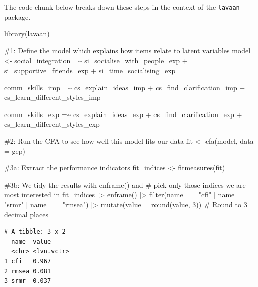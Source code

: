 \documentclass[
  letterpaper,
]{krantz}
\makeatletter
\newenvironment{Shaded}{\begin{snugshade}}{\end{snugshade}}
\newcommand{\AttributeTok}[1]{\textcolor[rgb]{0.40,0.45,0.13}{#1}}
\newcommand{\CommentTok}[1]{\textcolor[rgb]{0.37,0.37,0.37}{#1}}
\newcommand{\DecValTok}[1]{\textcolor[rgb]{0.68,0.00,0.00}{#1}}
\newcommand{\FunctionTok}[1]{\textcolor[rgb]{0.28,0.35,0.67}{#1}}
\newcommand{\NormalTok}[1]{\textcolor[rgb]{0.00,0.23,0.31}{#1}}
\newcommand{\OtherTok}[1]{\textcolor[rgb]{0.00,0.23,0.31}{#1}}
\newcommand{\SpecialCharTok}[1]{\textcolor[rgb]{0.37,0.37,0.37}{#1}}
\newcommand{\StringTok}[1]{\textcolor[rgb]{0.13,0.47,0.30}{#1}}
\newenvironment{kframe}{%
\medskip{}
\setlength{\fboxsep}{.8em}
 \def\at@end@of@kframe{}%
 \ifinner\ifhmode%
  \def\at@end@of@kframe{\end{minipage}}%
  \begin{minipage}{\columnwidth}%
 \fi\fi%
 \def\FrameCommand##1{\hskip\@totalleftmargin \hskip-\fboxsep
 \colorbox{shadecolor}{##1}\hskip-\fboxsep
     \hskip-\linewidth \hskip-\@totalleftmargin \hskip\columnwidth}%
 \MakeFramed {\advance\hsize-\width
   \@totalleftmargin\z@ \linewidth\hsize
   \@setminipage}}%
 {\par\unskip\endMakeFramed%
 \at@end@of@kframe}
\renewenvironment{Shaded}{\begin{kframe}}{\end{kframe}}
\makeatother
\begin{document}
The code chunk below breaks down these steps in the context of the
\texttt{lavaan} package.

\begin{Shaded}
\begin{Highlighting}[]
\FunctionTok{library}\NormalTok{(lavaan)}

\CommentTok{\#1: Define the model which explains how items relate to latent variables}
\NormalTok{model }\OtherTok{\textless{}{-}} \StringTok{\textquotesingle{}}
\StringTok{social\_integration =\textasciitilde{}}
\StringTok{si\_socialise\_with\_people\_exp +}
\StringTok{si\_supportive\_friends\_exp +}
\StringTok{si\_time\_socialising\_exp}

\StringTok{comm\_skills\_imp =\textasciitilde{}}
\StringTok{cs\_explain\_ideas\_imp +}
\StringTok{cs\_find\_clarification\_imp +}
\StringTok{cs\_learn\_different\_styles\_imp}

\StringTok{comm\_skills\_exp =\textasciitilde{}}
\StringTok{cs\_explain\_ideas\_exp +}
\StringTok{cs\_find\_clarification\_exp +}
\StringTok{cs\_learn\_different\_styles\_exp}
\StringTok{\textquotesingle{}}

\CommentTok{\#2: Run the CFA to see how well this model fits our data}
\NormalTok{fit }\OtherTok{\textless{}{-}} \FunctionTok{cfa}\NormalTok{(model, }\AttributeTok{data =}\NormalTok{ gep)}

\CommentTok{\#3a: Extract the performance indicators}
\NormalTok{fit\_indices }\OtherTok{\textless{}{-}} \FunctionTok{fitmeasures}\NormalTok{(fit)}

\CommentTok{\#3b: We tidy the results with enframe() and}
\CommentTok{\#    pick only those indices we are most interested in}
\NormalTok{fit\_indices }\SpecialCharTok{|\textgreater{}}
  \FunctionTok{enframe}\NormalTok{() }\SpecialCharTok{|\textgreater{}}
  \FunctionTok{filter}\NormalTok{(name }\SpecialCharTok{==} \StringTok{"cfi"} \SpecialCharTok{|}
\NormalTok{         name }\SpecialCharTok{==} \StringTok{"srmr"} \SpecialCharTok{|}
\NormalTok{         name }\SpecialCharTok{==} \StringTok{"rmsea"}\NormalTok{) }\SpecialCharTok{|\textgreater{}}
  \FunctionTok{mutate}\NormalTok{(}\AttributeTok{value =} \FunctionTok{round}\NormalTok{(value, }\DecValTok{3}\NormalTok{))   }\CommentTok{\# Round to 3 decimal places}
\end{Highlighting}
\end{Shaded}

\begin{verbatim}
# A tibble: 3 x 2
  name  value     
  <chr> <lvn.vctr>
1 cfi   0.967     
2 rmsea 0.081     
3 srmr  0.037     
\end{verbatim}
\end{document}
